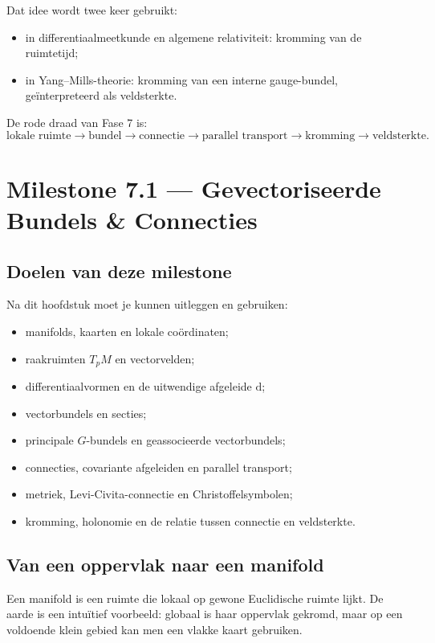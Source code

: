 \documentclass[11pt,a4paper]{article}
\newcommand{\dd}{\mathrm{d}}
\begin{document}
Dat idee wordt twee keer gebruikt:
\begin{itemize}
    \item in differentiaalmeetkunde en algemene relativiteit: kromming van de ruimtetijd;
    \item in Yang--Mills-theorie: kromming van een interne gauge-bundel, geïnterpreteerd als veldsterkte.
\end{itemize}

\begin{kernidee}
De rode draad van Fase 7 is:
\[
\text{lokale ruimte} \to \text{bundel} \to \text{connectie} \to \text{parallel transport} \to \text{kromming} \to \text{veldsterkte}.
\]
\end{kernidee}

\newpage
\section{Milestone 7.1 --- Gevectoriseerde Bundels \& Connecties}

\subsection{Doelen van deze milestone}
Na dit hoofdstuk moet je kunnen uitleggen en gebruiken:
\begin{itemize}
    \item manifolds, kaarten en lokale coördinaten;
    \item raakruimten $T_pM$ en vectorvelden;
    \item differentiaalvormen en de uitwendige afgeleide $\dd$;
    \item vectorbundels en secties;
    \item principale $G$-bundels en geassocieerde vectorbundels;
    \item connecties, covariante afgeleiden en parallel transport;
    \item metriek, Levi-Civita-connectie en Christoffelsymbolen;
    \item kromming, holonomie en de relatie tussen connectie en veldsterkte.
\end{itemize}

\subsection{Van een oppervlak naar een manifold}

Een manifold is een ruimte die lokaal op gewone Euclidische ruimte lijkt. De aarde is een intuïtief voorbeeld: globaal is haar oppervlak gekromd, maar op een voldoende klein gebied kan men een vlakke kaart gebruiken.
\end{document}
